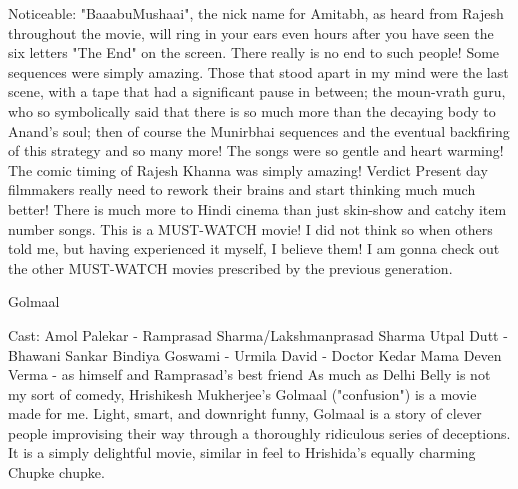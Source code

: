 \documentclass{article}
\begin{document}
Noticeable: "BaaabuMushaai", the nick name for Amitabh, as heard from Rajesh throughout the movie, will ring in your ears even hours after you have seen the six letters "The End" on the screen. There really is no end to such people! Some sequences were simply amazing. Those that stood apart in my mind were the last scene, with a tape that had a significant pause in between; the moun-vrath guru, who so symbolically said that there is so much more than the decaying body to Anand's soul; then of course the Munirbhai sequences and the eventual backfiring of this strategy and so many more! The songs were so gentle and heart warming! The comic timing of Rajesh Khanna was simply amazing! Verdict Present day filmmakers really need to rework their brains and start thinking much much better! There is much more to Hindi cinema than just skin-show and catchy item number songs. This is a MUST-WATCH movie! I did not think so when others told me, but having experienced it myself, I believe them! I am gonna check out the other MUST-WATCH movies prescribed by the previous generation. 


\Large{Golmaal}

Cast:\newline
    Amol Palekar - Ramprasad Sharma/Lakshmanprasad Sharma\newline
    Utpal Dutt - Bhawani Sankar\newline
    Bindiya Goswami - Urmila\newline
    David - Doctor Kedar Mama\newline
    Deven Verma - as himself and Ramprasad's best friend\newline
\newline
As much as Delhi Belly is not my sort of comedy, Hrishikesh Mukherjee's Golmaal ("confusion") is a movie made for me.  Light, smart, and downright funny, Golmaal is a story of clever people improvising their way through a thoroughly ridiculous series of deceptions.  It is a simply delightful movie, similar in feel to Hrishida's equally charming Chupke chupke. 
\end{document}
